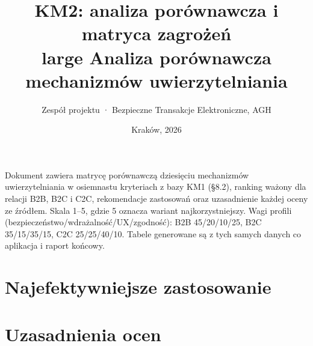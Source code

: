 \documentclass[11pt,a4paper]{article}
\title{\textbf{KM2: analiza porównawcza i matryca zagrożeń}\\large Analiza porównawcza mechanizmów uwierzytelniania}
\author{Zespół projektu · Bezpieczne Transakcje Elektroniczne, AGH}
\date{Kraków, 2026}
\begin{document}
\maketitle
\noindent Dokument zawiera matrycę porównawczą dziesięciu mechanizmów uwierzytelniania w osiemnastu kryteriach z bazy KM1 (§8.2), ranking ważony dla relacji B2B, B2C i C2C, rekomendacje zastosowań oraz uzasadnienie każdej oceny ze źródłem. Skala 1--5, gdzie 5 oznacza wariant najkorzystniejszy. Wagi profili (bezpieczeństwo/wdrażalność/UX/zgodność): B2B 45/20/10/25, B2C 35/15/35/15, C2C 25/25/40/10. Tabele generowane są z tych samych danych co aplikacja i raport końcowy.
\begin{landscape}

\end{landscape}

\section*{Najefektywniejsze zastosowanie}

\section*{Uzasadnienia ocen}

\printbibliography[title={Źródła}]
\end{document}
